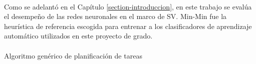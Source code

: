 \paragraph{}Como se adelantó en el Capítulo \ref{section-introduccion}, en este trabajo se evalúa el desempeño de las redes neuronales en el marco de SV.
Min-Min fue la heurística de referencia escogida para entrenar a los clasificadores de aprendizaje automático utilizados en este proyecto de grado.
 
 \paragraph{}
 \SetEndCharOfAlgoLine{}
 \begin{algorithm}[H]
\SetAlgoLined
{}
 \caption{Algoritmo genérico de planificación de tareas} \label{algorithm:planificacion-tareas}
\end{algorithm}